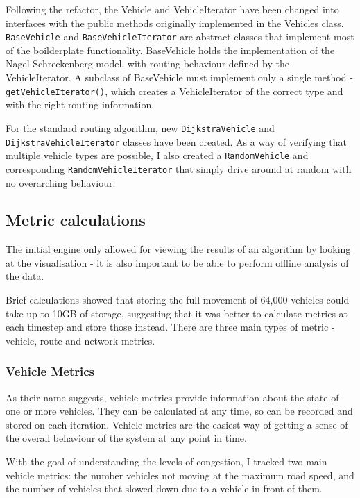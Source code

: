 \documentclass[ %
                    author={Alexander Hill},
                supervisor={Dr. Benjamin Sach},
                    degree={MEng},
                     title={MARMOSET},
                  subtitle={Multi-Agent Route Management using Online Simulation for Efficient Transportation},
                      type={research},
                      year={2016} ]{dissertation}
\begin{document}
Following the refactor, the Vehicle and VehicleIterator have been
changed into interfaces with the public methods originally implemented in the
Vehicles class. \texttt{BaseVehicle} and
\texttt{BaseVehicleIterator} are abstract classes that implement most of the
boilderplate functionality. BaseVehicle holds the implementation of the
Nagel-Schreckenberg model, with routing behaviour
defined by the VehicleIterator. A subclass of BaseVehicle must implement only a
single method - \texttt{getVehicleIterator()}, which creates a VehicleIterator
of the correct type and with the right routing information.

For the standard routing algorithm, new \texttt{DijkstraVehicle} and
\texttt{DijkstraVehicleIterator} classes have been created. As a way of
verifying that multiple vehicle types are possible, I also created a
\texttt{RandomVehicle} and corresponding \texttt{RandomVehicleIterator} that
simply drive around at random with no overarching behaviour.

\subsection{Metric calculations}

The initial engine only allowed for viewing the results of an algorithm by
looking at the visualisation - it is also important to be able to perform
offline analysis of the data.

Brief calculations showed that storing the full movement of 64,000 vehicles
could take up to 10GB of storage, suggesting that it was better to calculate
metrics at each timestep and store those instead. There are three main types of
metric - vehicle, route and network metrics.

\subsubsection{Vehicle Metrics}

As their name suggests, vehicle metrics provide information about the state of
one or more vehicles. They can be calculated at any time, so can be recorded
and stored on each iteration. Vehicle metrics are the easiest way of getting a
sense of the overall behaviour of the system at any point in time.

With the goal of understanding the levels of congestion, I tracked two main
vehicle metrics: the number vehicles not moving at the maximum road speed, and the
number of vehicles that slowed down due to a vehicle in front of them.
\end{document}
